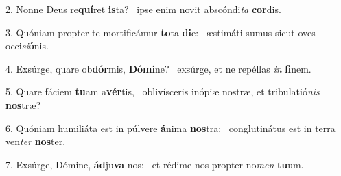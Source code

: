 2. Nonne Deus re\textbf{quí}ret \textbf{is}ta? \ast\  ipse enim novit abscóndi\textit{ta} \textbf{cor}dis.\

3. Quóniam propter te mortificámur \textbf{to}ta \textbf{di}e: \ast\  æstimáti sumus sicut oves occi\textit{si}\textbf{ó}nis.\

4. Exsúrge, quare ob\textbf{dór}mis, \textbf{Dó}\textbf{mi}ne? \ast\  exsúrge, et ne repéllas \textit{in} \textbf{fi}nem.\

5. Quare fáciem \textbf{tu}am a\textbf{vér}tis, \ast\  oblivísceris inópiæ nostræ, et tribulatió\textit{nis} \textbf{nos}træ?\

6. Quóniam humiliáta est in púlvere \textbf{á}nima \textbf{nos}tra: \ast\  conglutinátus est in terra ven\textit{ter} \textbf{nos}ter.\

7. Exsúrge, Dómine, \textbf{ád}ju\textbf{va} nos: \ast\  et rédime nos propter no\textit{men} \textbf{tu}um.\

